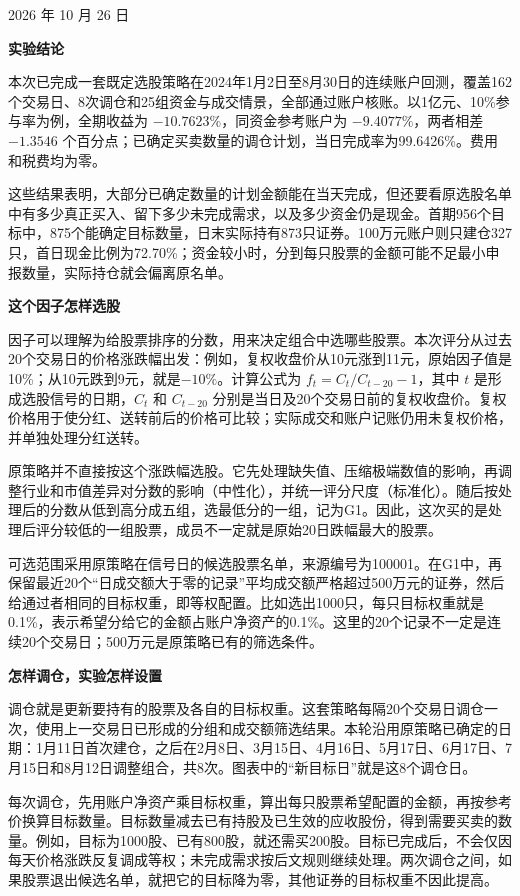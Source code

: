 \documentclass[UTF8,fontset=fandol,11pt,a4paper]{ctexart}
\newcommand{\lead}[1]{\par\medskip\Needspace{3\baselineskip}\noindent\textbf{#1}\par\smallskip}
\begin{document}
\hfill{\small 2026 年 10 月 26 日}
\lead{实验结论}
本次已完成一套既定选股策略在2024年1月2日至8月30日的连续账户回测，覆盖162个交易日、8次调仓和25组资金与成交情景，全部通过账户核账。以1亿元、10\%参与率为例，全期收益为 $-10.7623\%$，同资金参考账户为 $-9.4077\%$，两者相差 $-1.3546$ 个百分点；已确定买卖数量的调仓计划，当日完成率为99.6426\%。费用和税费均为零。

这些结果表明，大部分已确定数量的计划金额能在当天完成，但还要看原选股名单中有多少真正买入、留下多少未完成需求，以及多少资金仍是现金。首期956个目标中，875个能确定目标数量，日末实际持有873只证券。100万元账户则只建仓327只，首日现金比例为72.70\%；资金较小时，分到每只股票的金额可能不足最小申报数量，实际持仓就会偏离原名单。

\lead{这个因子怎样选股}
因子可以理解为给股票排序的分数，用来决定组合中选哪些股票。本次评分从过去20个交易日的价格涨跌幅出发：例如，复权收盘价从10元涨到11元，原始因子值是10\%；从10元跌到9元，就是$-10\%$。计算公式为 $f_t=C_t/C_{t-20}-1$，其中 $t$ 是形成选股信号的日期，$C_t$ 和 $C_{t-20}$ 分别是当日及20个交易日前的复权收盘价。复权价格用于使分红、送转前后的价格可比较；实际成交和账户记账仍用未复权价格，并单独处理分红送转。

原策略并不直接按这个涨跌幅选股。它先处理缺失值、压缩极端数值的影响，再调整行业和市值差异对分数的影响（中性化），并统一评分尺度（标准化）。随后按处理后的分数从低到高分成五组，选最低分的一组，记为G1。因此，这次买的是处理后评分较低的一组股票，成员不一定就是原始20日跌幅最大的股票。

可选范围采用原策略在信号日的候选股票名单，来源编号为100001。在G1中，再保留最近20个“日成交额大于零的记录”平均成交额严格超过500万元的证券，然后给通过者相同的目标权重，即等权配置。比如选出1000只，每只目标权重就是0.1\%，表示希望分给它的金额占账户净资产的0.1\%。这里的20个记录不一定是连续20个交易日；500万元是原策略已有的筛选条件。

\lead{怎样调仓，实验怎样设置}
调仓就是更新要持有的股票及各自的目标权重。这套策略每隔20个交易日调仓一次，使用上一交易日已形成的分组和成交额筛选结果。本轮沿用原策略已确定的日期：1月11日首次建仓，之后在2月8日、3月15日、4月16日、5月17日、6月17日、7月15日和8月12日调整组合，共8次。图表中的“新目标日”就是这8个调仓日。

每次调仓，先用账户净资产乘目标权重，算出每只股票希望配置的金额，再按参考价换算目标数量。目标数量减去已有持股及已生效的应收股份，得到需要买卖的数量。例如，目标为1000股、已有800股，就还需买200股。目标已完成后，不会仅因每天价格涨跌反复调成等权；未完成需求按后文规则继续处理。两次调仓之间，如果股票退出候选名单，就把它的目标降为零，其他证券的目标权重不因此提高。
\end{document}
